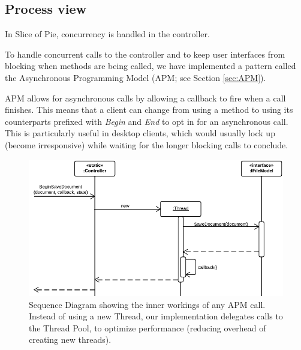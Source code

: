 \subsection{Process view}

In Slice of Pie, concurrency is handled in the controller.

To handle concurrent calls to the controller and to keep user interfaces from blocking when methods
are being called, we have implemented a pattern called the Asynchronous Programming Model (APM; see
Section \ref{sec:APM}).

APM allows for asynchronous calls by allowing a callback to fire when a call finishes. This means that
a client can change from using a method to using its counterparts prefixed with \emph{Begin} and
\emph{End} to opt in for an asynchronous call. This is particularly useful in desktop clients, which
would usually lock up (become irresponsive) while waiting for the longer blocking calls to conclude.

\begin{figure}[htb]
	\centering
	\includegraphics[width=1\textwidth]{Software_architecture/graphics/apm-sequence.png}
	\caption{Sequence Diagram showing the inner workings of any APM call. Instead of using a new Thread, our implementation
        delegates calls to the Thread Pool, to optimize performance (reducing overhead of creating new threads).}
	\label{fig:apm-sequence}
\end{figure}